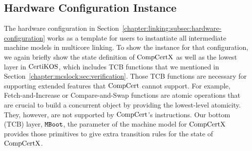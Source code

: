 
\subsection{Hardware Configuration Instance}
\label{chapter:certikos:subsec:hardware-configuration-instance}

The hardware configuration in Section~\ref{chapter:linking:subsec:hardware-configuration} works as a 
template for users to instantiate all intermediate machine models in multicore linking. 
To show the instance for that configuration,
we again briefly show the state definition of $\mathrm{CompCertX}$
as well as the lowest layer in $\mathrm{CertiKOS}$, which includes TCB functions that we mentioned in Section~\ref{chapter:mcslock:sec:verification}.
Those TCB functions are 
necessary for supporting extended features that $\mathrm{CompCert}$ cannot support. 
For example, 
Fetch-and-Increase or Compare-and-Swap functions are atomic operations that are crucial to build a 
concurrent object by providing the lowest-level atomicity. 
They, however, are not supported by $\mathrm{CompCert}$'s instructions.
Our bottom (TCB) layer, ${\mathrm{\texttt{MBoot}}}$, the parameter of the machine model for $\mathrm{CompCertX}$ 
provides those  primitives to give  extra transition rules for the state of $\mathrm{CompCertX}$.
%
%



